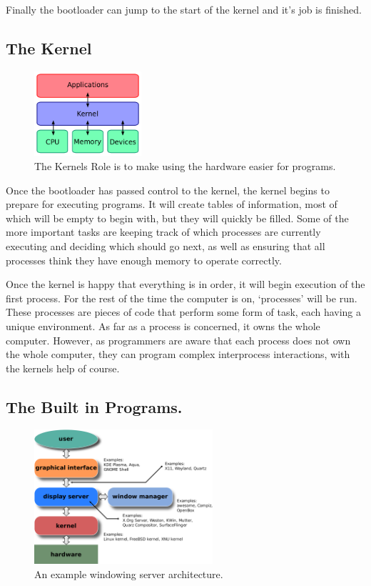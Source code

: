 \documentclass[a4paper]{report}
\begin{document}
Finally the bootloader can jump to the start of the kernel and it's job is finished.


\subsection*{The Kernel}

\begin{figure}
\centering
\includegraphics[width=150px]{images/kernel}
\caption{The Kernels Role is to make using the hardware easier for programs.}
\vspace{-10pt}
\label{fig:thekernel}
\end{figure}

Once the bootloader has passed control to the kernel, the kernel begins to prepare for executing programs. It will create tables of information, most of which will be empty to begin with, but they will quickly be filled. Some of the more important tasks are keeping track of which processes are currently executing and deciding which should go next, as well as ensuring that all processes think they have enough memory to operate correctly.

Once the kernel is happy that everything is in order, it will begin execution of the first process. For the rest of the time the computer is on, `processes' will be run. These processes are pieces of code that perform some form of task, each having a unique environment. As far as a process is concerned, it owns the whole computer. However, as programmers are aware that each process does not own the whole computer, they can program complex interprocess interactions, with the kernels help of course.


\subsection*{The Built in Programs.}

\begin{figure}
\centering
\includegraphics[width=250px]{images/windowing}
\caption{An example windowing server architecture.}
\label{fig:theserver}
\end{figure}
\end{document}
